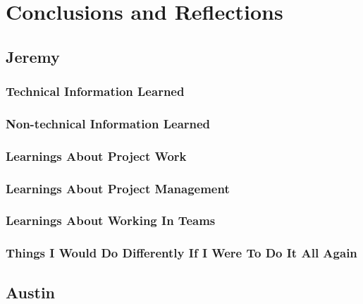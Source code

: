 \documentclass[onecolumn, draftclsnofoot,10pt, compsoc]{IEEEtran}
\begin{document}
\section{Conclusions and Reflections}


\subsection{Jeremy}
	\subsubsection{Technical Information Learned}
	
	
	
	\subsubsection{Non-technical Information Learned}
	
	


	\subsubsection{Learnings About Project Work}
	
	
	
	
	\subsubsection{Learnings About Project Management}




	\subsubsection{Learnings About Working In Teams}




	\subsubsection{Things I Would Do Differently If I Were To Do It All Again}






\subsection{Austin}
\end{document}
